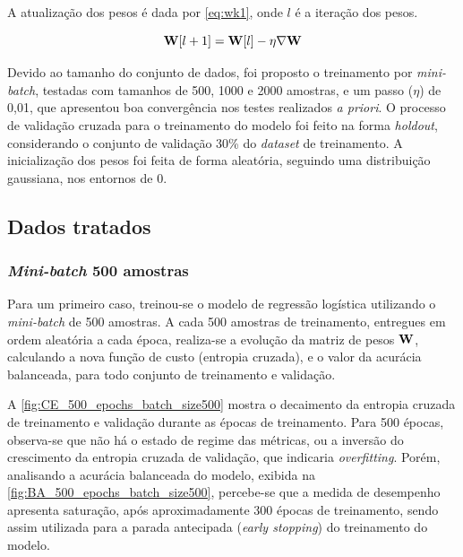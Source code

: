 A atualização dos pesos é dada por \eqref{eq:wk1}, onde $l$ é a iteração dos pesos.

\begin{equation}\label{eq:wk1}
	\mathbf{W}[l+1] = \mathbf{W}[l] - \eta\nabla\mathbf{W}
\end{equation}

Devido ao tamanho do conjunto de dados, foi proposto o treinamento por \textit{mini-batch}, testadas com tamanhos de 500, 1000 e 2000 amostras, e um passo ($\eta$) de 0,01, que apresentou boa convergência nos testes realizados \textit{a priori}. O processo de validação cruzada para o treinamento do modelo foi feito na forma \textit{holdout}, considerando o conjunto de validação 30\% do \textit{dataset} de treinamento. A inicialização dos pesos foi feita de forma aleatória, seguindo uma distribuição gaussiana, nos entornos de 0.



\clearpage
\subsection{Dados tratados}

\subsubsection*{\textit{Mini-batch} 500 amostras}

Para um primeiro caso, treinou-se o modelo de regressão logística utilizando o \textit{mini-batch} de 500 amostras. A cada 500 amostras de treinamento, entregues em ordem aleatória a cada época, realiza-se a evolução da matriz de pesos $\mathbf{W}$, calculando a nova função de custo (entropia cruzada), e o valor da acurácia balanceada, para todo conjunto de treinamento e validação.

A \autoref{fig:CE_500_epochs_batch_size500} mostra o decaimento da entropia cruzada de treinamento e validação durante as épocas de treinamento. Para 500 épocas, observa-se que não há o estado de regime das métricas, ou a inversão do crescimento da entropia cruzada de validação, que indicaria \textit{overfitting}. Porém, analisando a acurácia balanceada do modelo, exibida na \autoref{fig:BA_500_epochs_batch_size500}, percebe-se que a medida de desempenho apresenta saturação, após aproximadamente 300 épocas de treinamento, sendo assim utilizada para a parada antecipada (\textit{early stopping}) do treinamento do modelo.

